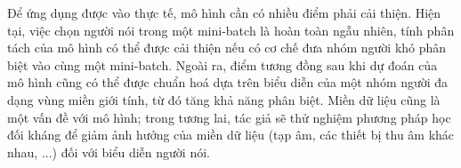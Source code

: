 \documentclass[a4paper, 13pt, oneside]{report}
\begin{document}
Để ứng dụng được vào thực tế, mô hình cần có nhiều điểm phải cải thiện. Hiện tại, việc chọn người nói trong một mini-batch là hoàn toàn ngẫu nhiên, tính phân tách của mô hình có thể được cải thiện nếu có cơ chế đưa nhóm người khó phân biệt vào cùng một mini-batch. Ngoài ra, điểm tương đồng sau khi dự đoán của mô hình cũng có thể được chuẩn hoá dựa trên biểu diễn của một nhóm người đa dạng vùng miền giới tính, từ đó tăng khả năng phân biệt. Miền dữ liệu cũng là một vấn đề với mô hình; trong tương lai, tác giả sẽ thử nghiệm phương pháp học đối kháng để giảm ảnh hưởng của miền dữ liệu (tạp âm, các thiết bị thu âm khác nhau, ...) đối với biểu diễn người nói.

\pagebreak



\end{document}
